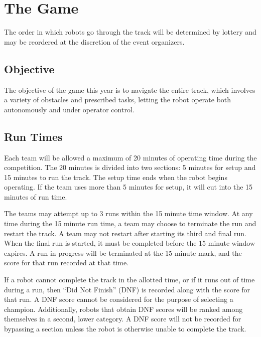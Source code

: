 \section{The Game}
The order in which robots go through the track will be determined by lottery and may be reordered at the discretion of the event organizers. 

\subsection{Objective}
The objective of the game this year is to navigate the entire track, which involves a variety of obstacles and prescribed tasks, letting the robot operate both autonomously and under operator control.

\subsection{Run Times}
Each team will be allowed a maximum of 20 minutes of operating time during the competition. The 20 minutes is divided into two sections: 5 minutes for setup and 15 minutes to run the track. The setup time ends when the robot begins operating. If the team uses more than 5 minutes for setup, it will cut into the 15 minutes of run time. 

The teams may attempt up to 3 runs within the 15 minute time window. At any time during the 15 minute run time, a team may choose to terminate the run and restart the track. A team may not restart after starting its third and final run. When the final run is started, it must be completed before the 15 minute window expires. A run in-progress will be terminated at the 15 minute mark, and the score for that run recorded at that time.

If a robot cannot complete the track in the allotted time, or if it runs out of time during a run, then “Did Not Finish” (DNF) is recorded along with the score for that run. A DNF score cannot be considered for the purpose of selecting a champion. Additionally, robots that obtain DNF scores will be ranked among themselves in a second, lower category. A DNF score will not be recorded for bypassing a section unless the robot is otherwise unable to complete the track.

